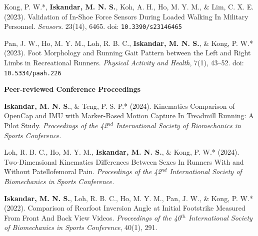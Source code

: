 \documentclass[../main.tex]{subfiles}
\begin{document}
\begin{etaremune}
            \item\label{article: sensors validation exoskeletal} {Kong, P. W.*, \textbf{Iskandar, M. N. S.}, Koh, A. H., Ho, M. Y. M., \& Lim, C. X. E. (2023). Validation of In-Shoe Force Sensors During Loaded Walking In Military Personnel. \textit{Sensors}. 23(14), 6465. doi: \nolinkurl{10.3390/s23146465} \href{https://doi.org/10.3390/s23146465}{\faFilePdfO} \href{https://github.com/Shahril-Iskandar/publication-loadsol-validation-military}{\faGithub}} %
            
            \item\label{article: paah foot morphology} {Pan, J. W., Ho, M. Y. M., Loh, R. B. C., \textbf{Iskandar, M. N. S.}, \& Kong, P. W.* (2023). Foot Morphology and Running Gait Pattern between the Left and Right Limbs in Recreational Runners. \textit{Physical Activity and Health}, 7(1), 43–52. doi: \nolinkurl{10.5334/paah.226} \href{https://doi.org/10.5334/paah.226}{\faFilePdfO}} %
        \end{etaremune}
                
        \textbf{Peer-reviewed Conference Proceedings}
        \def\labelprefix{C}
        \begin{etaremune}
            \item\label{conference: isbs2024opencap} {\textbf{Iskandar, M. N. S.}, \& Teng, P. S. P.* (2024). Kinematics Comparison of OpenCap and IMU with Marker-Based Motion Capture In Treadmill Running: A Pilot Study. \textit{Proceedings of the 42$^{nd}$ International Society of Biomechanics in Sports Conference.} \href{https://commons.nmu.edu/isbs/vol42/iss1/136/}{\faFilePdfO} \href{https://github.com/Shahril-Iskandar/publication-conference-validation}{\faGithub}}
        
            \item\label{conference: isbs2024raystudy} Loh, R. B. C., Ho, M. Y. M., {\textbf{Iskandar, M. N. S.}, \& Kong, P. W.* (2024). Two-Dimensional Kinematics Differences Between Sexes In Runners With and Without Patellofemoral Pain. \textit{Proceedings of the 42$^{nd}$ International Society of Biomechanics in Sports Conference.}} \href{https://commons.nmu.edu/isbs/vol42/iss1/124/}{\faFilePdfO}
            
            \item\label{conference: isbs2022} {\textbf{Iskandar, M. N. S.}, Loh, R. B. C., Ho, M. Y. M., Pan, J. W., \& Kong, P. W.* (2022). Comparison of Rearfoot Inversion Angle at Initial Footstrike Measured From Front And Back View Videos. \textit{Proceedings of the 40$^{th}$ International Society of Biomechanics in Sports Conference}, 40(1), 291. \href{https://commons.nmu.edu/isbs/vol40/iss1/70/}{\faFilePdfO}}
        \end{etaremune}
\end{document}
